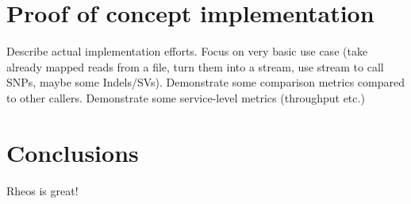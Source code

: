 \section{Proof of concept implementation}

Describe actual implementation efforts. Focus on very basic use case (take already mapped reads from a file, turn them into a stream, use stream to call SNPs, maybe some Indels/SVs). Demonstrate some comparison metrics compared to other callers. Demonstrate some service-level metrics (throughput etc.)

\section{Conclusions}
Rheos is great!